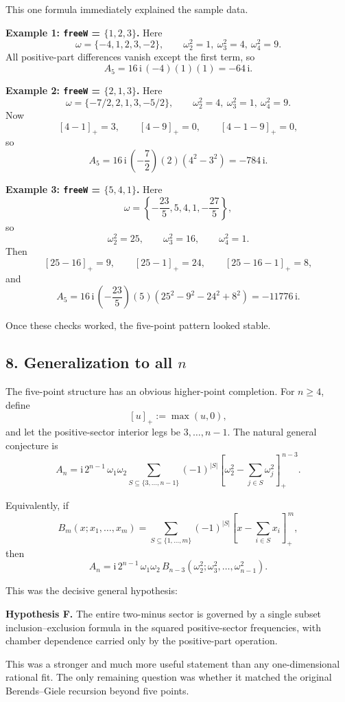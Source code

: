 \documentclass[11pt]{article}
\newcommand{\pp}[1]{\left[#1\right]_+}
\newcommand{\ii}{\mathrm{i}}
\begin{document}
This one formula immediately explained the sample data.

\textbf{Example 1: \texttt{freeW} = $\{1,2,3\}$.}
Here
\[
\omega = \{-4,1,2,3,-2\},
\qquad
\omega_2^2=1,\ \omega_3^2=4,\ \omega_4^2=9.
\]
All positive-part differences vanish except the first term, so
\[
A_5
=
16\,\ii\,(-4)(1)(1)
=
-64\,\ii.
\]

\textbf{Example 2: \texttt{freeW} = $\{2,1,3\}$.}
Here
\[
\omega = \{-7/2,2,1,3,-5/2\},
\qquad
\omega_2^2=4,\ \omega_3^2=1,\ \omega_4^2=9.
\]
Now
\[
\pp{4-1}=3,\qquad \pp{4-9}=0,\qquad \pp{4-1-9}=0,
\]
so
\[
A_5
=
16\,\ii\,\left(-\frac72\right)(2)\left(4^2-3^2\right)
=
-784\,\ii.
\]

\textbf{Example 3: \texttt{freeW} = $\{5,4,1\}$.}
Here
\[
\omega = \left\{-\frac{23}{5},5,4,1,-\frac{27}{5}\right\},
\]
so
\[
\omega_2^2=25,\qquad \omega_3^2=16,\qquad \omega_4^2=1.
\]
Then
\[
\pp{25-16}=9,\qquad \pp{25-1}=24,\qquad \pp{25-16-1}=8,
\]
and
\[
A_5
=
16\,\ii\,\left(-\frac{23}{5}\right)(5)\left(25^2-9^2-24^2+8^2\right)
=
-11776\,\ii.
\]

Once these checks worked, the five-point pattern looked stable.

\subsection*{8. Generalization to all $n$}

The five-point structure has an obvious higher-point completion. For
$n \ge 4$, define
\[
\pp{u}:=\max(u,0),
\]
and let the positive-sector interior legs be $3,\ldots,n-1$. The natural
general conjecture is
\[
A_n
=
\ii\,2^{n-1}\,\omega_1\omega_2
\sum_{S\subseteq\{3,\ldots,n-1\}}
(-1)^{|S|}
\pp{\omega_2^2-\sum_{j\in S}\omega_j^2}^{\,n-3}.
\]

Equivalently, if
\[
B_m(x;x_1,\ldots,x_m)
=
\sum_{S\subseteq\{1,\ldots,m\}}
(-1)^{|S|}
\pp{x-\sum_{i\in S}x_i}^{\,m},
\]
then
\[
A_n
=
\ii\,2^{n-1}\,\omega_1\omega_2\,
B_{n-3}\!\left(\omega_2^2;\omega_3^2,\ldots,\omega_{n-1}^2\right).
\]

This was the decisive general hypothesis:

\medskip
\textbf{Hypothesis F.} The entire two-minus sector is governed by a single
subset inclusion--exclusion formula in the squared positive-sector frequencies,
with chamber dependence carried only by the positive-part operation.
\medskip

This was a stronger and much more useful statement than any one-dimensional
rational fit. The only remaining question was whether it matched the original
Berends--Giele recursion beyond five points.
\end{document}
